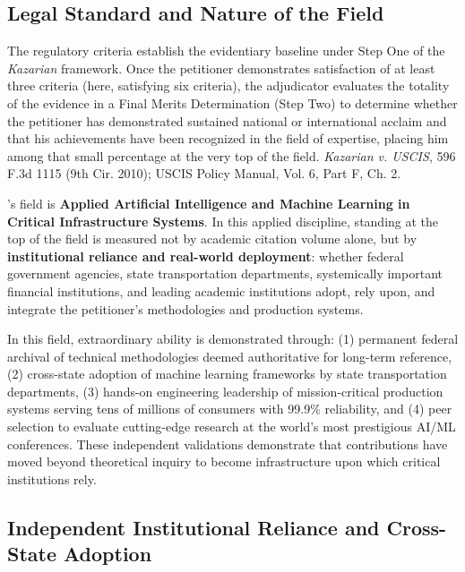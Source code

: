 
\subsection{Legal Standard and Nature of the Field}
\label{finalmerits:standard}

The regulatory criteria establish the evidentiary baseline under Step One of the \textit{Kazarian} framework. Once the petitioner demonstrates satisfaction of at least three criteria (here, satisfying six criteria), the adjudicator evaluates the totality of the evidence in a Final Merits Determination (Step Two) to determine whether the petitioner has demonstrated sustained national or international acclaim and that his achievements have been recognized in the field of expertise, placing him among that small percentage at the very top of the field. \textit{Kazarian v. USCIS}, 596 F.3d 1115 (9th Cir. 2010); USCIS Policy Manual, Vol. 6, Part F, Ch. 2.

\dr's field is \textbf{Applied Artificial Intelligence and Machine Learning in Critical Infrastructure Systems}. In this applied discipline, standing at the top of the field is measured not by academic citation volume alone, but by \textbf{institutional reliance and real-world deployment}: whether federal government agencies, state transportation departments, systemically important financial institutions, and leading academic institutions adopt, rely upon, and integrate the petitioner's methodologies and production systems.

In this field, extraordinary ability is demonstrated through: (1) permanent federal archival of technical methodologies deemed authoritative for long-term reference, (2) cross-state adoption of machine learning frameworks by state transportation departments, (3) hands-on engineering leadership of mission-critical production systems serving tens of millions of consumers with 99.9\% reliability, and (4) peer selection to evaluate cutting-edge research at the world's most prestigious AI/ML conferences. These independent validations demonstrate that \drs contributions have moved beyond theoretical inquiry to become infrastructure upon which critical institutions rely.

\subsection{Independent Institutional Reliance and Cross-State Adoption}
\label{finalmerits:reliance}


